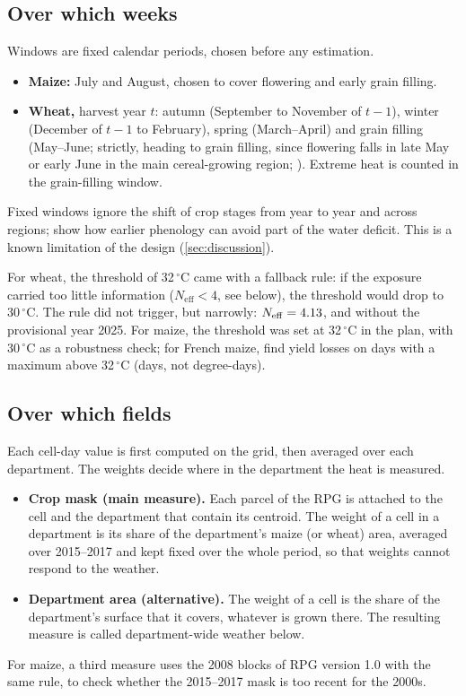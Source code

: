 \subsection{Over which weeks}

Windows are fixed calendar periods, chosen before any estimation.
\begin{itemize}
  \item \textbf{Maize:} July and August, chosen to cover flowering and early grain filling.
  \item \textbf{Wheat,} harvest year $t$: autumn (September to November of $t-1$), winter (December of $t-1$ to February), spring (March--April) and grain filling (May--June; strictly, heading to grain filling, since flowering falls in late May or early June in the main cereal-growing region; \cite{noiajunior2025}). Extreme heat is counted in the grain-filling window.
\end{itemize}
Fixed windows ignore the shift of crop stages from year to year and across regions; \textcite{leroux2024} show how earlier phenology can avoid part of the water deficit. This is a known limitation of the design (\cref{sec:discussion}).

For wheat, the threshold of 32\,$^{\circ}$C came with a fallback rule: if the exposure carried too little information ($N_{\mathrm{eff}} < 4$, see below), the threshold would drop to 30\,$^{\circ}$C. The rule did not trigger, but narrowly: $N_{\mathrm{eff}} = 4.13$, and \NeffWheatNoTwentyFive{} without the provisional year 2025. For maize, the threshold was set at 32\,$^{\circ}$C in the plan, with 30\,$^{\circ}$C as a robustness check; for French maize, \textcite{hawkins2013} find yield losses on days with a maximum above 32\,$^{\circ}$C (days, not degree-days).

\subsection{Over which fields}

Each cell-day value is first computed on the grid, then averaged over each department. The weights decide where in the department the heat is measured.
\begin{itemize}
  \item \textbf{Crop mask (main measure).} Each parcel of the RPG is attached to the cell and the department that contain its centroid. The weight of a cell in a department is its share of the department's maize (or wheat) area, averaged over 2015--2017 and kept fixed over the whole period, so that weights cannot respond to the weather.
  \item \textbf{Department area (alternative).} The weight of a cell is the share of the department's surface that it covers, whatever is grown there. The resulting measure is called department-wide weather below.
\end{itemize}
For maize, a third measure uses the 2008 blocks of RPG version 1.0 with the same rule, to check whether the 2015--2017 mask is too recent for the 2000s.

